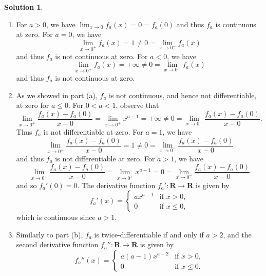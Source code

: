 \documentclass[12pt]{article}
\theoremstyle{definition}
\theoremstyle{exercise}
\theoremstyle{solution}
\newtheorem*{solution}{Solution}
\newcommand{\R}{\mathbf{R}}
\begin{document}
\begin{solution}
    \begin{enumerate}
        \item For \( a > 0 \), we have \( \lim_{x \to 0} f_a(x) = 0 = f_a(0) \) and thus \( f_a \) is continuous at zero. For \( a = 0 \), we have
        \[
            \lim_{x \to 0^+} f_a(x) = 1 \neq 0 = \lim_{x \to 0^-} f_a(x)
        \]
        and thus \( f_a \) is not continuous at zero. For \( a < 0 \), we have
        \[
            \lim_{x \to 0^+} f_a(x) = +\infty \neq 0 = \lim_{x \to 0^-} f_a(x)
        \]
        and thus \( f_a \) is not continuous at zero.

        \item As we showed in part (a), \( f_a \) is not continuous, and hence not differentiable, at zero for \( a \leq 0 \). For \( 0 < a < 1 \), observe that
        \[
            \lim_{x \to 0^+} \frac{f_a(x) - f_a(0)}{x - 0} = \lim_{x \to 0^+} x^{a - 1} = +\infty \neq 0 = \lim_{x \to 0^-} \frac{f_a(x) - f_a(0)}{x - 0}.
        \]
        Thus \( f_a \) is not differentiable at zero. For \( a = 1 \), we have
        \[
            \lim_{x \to 0^+} \frac{f_a(x) - f_a(0)}{x - 0} = 1 \neq 0 = \lim_{x \to 0^-} \frac{f_a(x) - f_a(0)}{x - 0}
        \]
        and thus \( f_a \) is not differentiable at zero. For \( a > 1 \), we have
        \[
            \lim_{x \to 0^+} \frac{f_a(x) - f_a(0)}{x - 0} = \lim_{x \to 0^+} x^{a - 1} = 0 = \lim_{x \to 0^-} \frac{f_a(x) - f_a(0)}{x - 0}
        \]
        and so \( f_a'(0) = 0 \). The derivative function \( f_a' : \R \to \R \) is given by
        \[
            f_a'(x) = \begin{cases}
                a x^{a - 1} & \text{if } x > 0, \\
                0 & \text{if } x \leq 0,
            \end{cases}
        \]
        which is continuous since \( a > 1 \).

        \item Similarly to part (b), \( f_a \) is twice-differentiable if and only if \( a > 2 \), and the second derivative function \( f_a'' : \R \to \R \) is given by
        \[
            f_a''(x) = \begin{cases}
                a (a - 1) x^{a - 2} & \text{if } x > 0, \\
                0 & \text{if } x \leq 0.
            \end{cases}
        \]
    \end{enumerate}
\end{solution}
\end{document}
